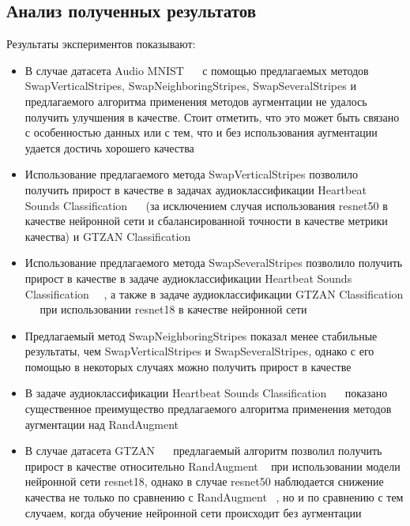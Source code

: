 \documentclass[12pt, fleqn]{article}
\begin{document}
\newpage
\subsection{Анализ полученных результатов}

Результаты экспериментов показывают:

\begin{itemize}
    \item В случае датасета Audio MNIST ~\cite{AudioMnistArticle}~\cite{AudioMnistKaggle} с помощью предлагаемых методов SwapVerticalStripes, SwapNeighboringStripes, SwapSeveralStripes и предлагаемого алгоритма применения методов аугментации не удалось получить улучшения в качестве. Стоит отметить, что это может быть связано с особенностью данных или с тем, что и без использования аугментации удается достичь хорошего качества
    \item Использование предлагаемого метода SwapVerticalStripes позволило получить прирост в качестве в задачах аудиоклассификации Heartbeat Sounds Classification
    ~\cite{HeartbeatSoundsArticle}~\cite{HeartbeatSoundsKaggle} (за исключением случая использования resnet50 в качестве нейронной сети и сбалансированной точности в качестве метрики качества) и GTZAN Classification ~\cite{GTZAN_Article}~\cite{GTZAN_kaggle}
    \item Использование предлагаемого метода SwapSeveralStripes позволило получить прирост в качестве в задаче аудиоклассификации Heartbeat Sounds Classification
    ~\cite{HeartbeatSoundsArticle}~\cite{HeartbeatSoundsKaggle}, а также в задаче аудиоклассификации  GTZAN Classification ~\cite{GTZAN_Article}~\cite{GTZAN_kaggle} при использовании resnet18 в качестве нейронной сети
    \item Предлагаемый метод SwapNeighboringStripes показал менее стабильные результаты, чем SwapVerticalStripes и SwapSeveralStripes, однако с его помощью в некоторых случаях можно получить прирост в качестве
    \item В задаче аудиоклассификации Heartbeat Sounds Classification ~\cite{HeartbeatSoundsArticle}~\cite{HeartbeatSoundsKaggle} показано существенное преимущество предлагаемого алгоритма применения методов аугментации над RandAugment ~\cite{RandAugment}
    \item В случае датасета GTZAN ~\cite{GTZAN_Article}~\cite{GTZAN_kaggle} предлагаемый алгоритм позволил получить прирост в качестве относительно RandAugment ~\cite{RandAugment} при использовании модели нейронной сети resnet18, однако в случае resnet50 наблюдается снижение качества не только по сравнению с RandAugment ~\cite{RandAugment}, но и по сравнению с тем случаем, когда обучение нейронной сети происходит без аугментации
\end{itemize}
\end{document}

